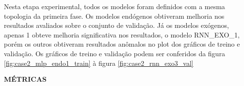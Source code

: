 \documentclass[	12pt, Times, openright, twoside, a4paper, english, brazil]{abntex2}
\begin{document}
    	    \begin{figure}[H]
            \end{figure}
            \begin{figure}[H]
            \end{figure}
            
    	    Nesta etapa experimental, todos os modelos foram definidos com a mesma topologia da primeira fase.
    	    Os modelos endógenos obtiveram melhoria nos resultados avaliados sobre o conjunto de validação.
    	    Já os modelos exógenos, apenas 1 obteve melhoria significativa nos resultados, o modelo RNN\_EXO\_1, porém os outros obtiveram resultados anômalos no plot dos gráficos de treino e validação.
    	    Os gráficos de treino e validação podem ser conferidos da figura \ref{fig:case2_mlp_endo1_train} à figura \ref{fig:case2_rnn_exo3_val}
    	    
    	   \textbf{ MÉTRICAS}
    	   
\end{document}
